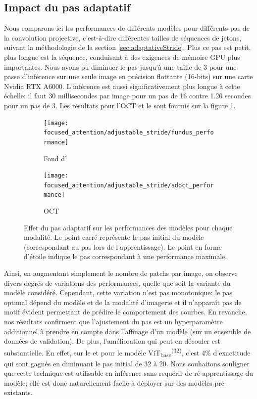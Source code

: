 \subsection{Impact du pas adaptatif}
Nous comparons ici les performances de différents modèles pour différents pas de la convolution projective, c'est-à-dire différentes tailles de séquences de jetons, suivant la méthodologie de la section \ref{sec:adaptativeStride}. Plus ce pas est petit, plus longue est la séquence, conduisant à des exigences de mémoire \ac{GPU} plus importantes. Nous avons pu diminuer le pas jusqu'à une taille de 3 pour une passe d'inférence sur une seule image en précision flottante (16-bits) sur une carte Nvidia RTX A6000. L'inférence est aussi significativement plus longue à cette échelle: il faut 30 millisecondes par image pour un pas de 16 contre 1.26 secondes pour un pas de 3. Les résultats pour l'OCT et le \fundus{} sont fournis sur la figure \ref{fig:adaptativeStrideImpact}.
\begin{figure}[h]
	\centering
	\begin{subfigure}{.47\textwidth}
		\texttt{[image: focused\_attention/adjustable\_stride/fundus\_performance]}
		\caption{Fond d'\oeil}
	\end{subfigure}
	\begin{subfigure}{.47
			\textwidth}
		\texttt{[image: focused\_attention/adjustable\_stride/sdoct\_performance]}
		\caption{OCT}
	\end{subfigure}
\caption{Effet du pas adaptatif sur les performances des modèles pour chaque modalité. Le point carré représente le pas initial du modèle (correspondant au pas lors de l'apprentissage). Le point en forme d'étoile indique le pas correspondant à une performance maximale. }
\label{fig:adaptativeStrideImpact}
\end{figure}
Ainsi, en augmentant simplement le nombre de patchs par image, on observe divers degrés de variations des performances, quelle que soit la variante du modèle considéré. Cependant, cette variation n'est pas monotonique: le pas optimal dépend du modèle et de la modalité d'imagerie et il n'apparaît pas de motif évident permettant de prédire le comportement des courbes. En revanche, nos résultats confirment que l'ajustement du pas est un hyperparamètre additionnel à prendre en compte dans l'affinage d'un modèle (sur un ensemble de données de validation). De plus, l'amélioration qui peut en découler est substantielle. En effet, sur le \fundus et pour le modèle ViT\textsubscript{base}\textsuperscript{(32)}, c'est 4\% d'exactitude qui sont gagnés en diminuant le pas initial de 32 à 20. Nous souhaitons souligner que cette technique est utilisable en inférence sans requérir de ré-apprentissage du modèle; elle est donc naturellement facile à déployer sur des modèles pré-existants.

